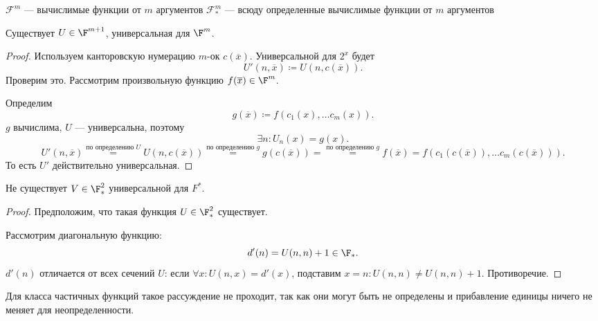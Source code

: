 \begin{descriprion}
	$ \mathcal{F}^{m}$ --- вычислимые функции от $  m$ аргументов
	$ \mathcal{F}^{m}_{*}$ --- всюду определенные вычислимые функции от $  m$ аргументов
\end{descriprion}

\begin{cor}
    Существует $ U \in  \F^{m+1}$, универсальная для $ \F^{m}$.
\end{cor}
\begin{proof}
	Используем канторовскую нумерацию $ m$-ок $ c(\overline{x})$.
	Универсальной для $ 2^{x}$ будет
	\[
		U'(n, \overline{x}) \coloneqq U(n, c(\overline{x}))
	.\] 
	Проверим это. Рассмотрим произвольную функцию $ f(\overline{x}) \in \F^{m}$.

	Определим 
	\[
		g(\overline{x})\coloneqq f(c_1(x), \ldots c_m(x))
	.\] 
	$ g$ вычислима, $ U$ --- универсальна, поэтому 
	\[
		\exists n \colon  U_n(x) = g(x)
	.\] 
	\[
		U'(n, \overline{x}) \stackrel{\text{по определению } U}{=} U(n, c(\overline{x})) \stackrel{\text{по определению } g}{=} g(c(\overline{x})) = \stackrel{\text{по определению } g}{=}  f(\overline{x}) = f(c_1(c(\overline{x})), \ldots c_{m}(c(\overline{x})))
	.\] 
	То есть $ U'$ действительно универсальная.
\end{proof}


\begin{thm}
    Не существует $ V \in \F_{*}^{2}$ универсальной для $ F^{*}$.
\end{thm}
\begin{proof}
    Предположим, что такая функция $ U \in  \F_{*}^{2}$ существует.

	Рассмотрим диагональную функцию:
	\[
		d'(n) = U(n, n) + 1 \in \F_{*}
	.\] 
	$d'(n)$ отличается от всех сечений $ U$: если $ \forall x \colon U(n, x) = d'(x)$, подставим $ x= n \colon U(n, n) \ne U(n, n ) + 1$. Противоречие. 
\end{proof}
\begin{note}
    Для класса частичных функций такое рассуждение не проходит, так как они могут быть не определены и прибавление единицы ничего не меняет для неопределенности.
\end{note}

